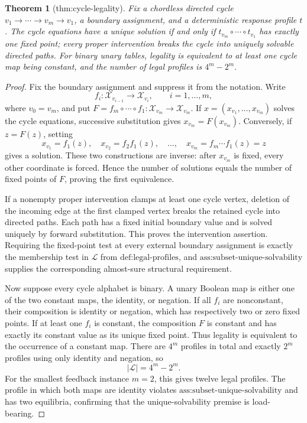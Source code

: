 \documentclass{article}
\newtheorem{theorem}{Theorem}
\begin{document}
\begin{theorem}[thm:cycle-legality]\label{thm:cycle-legality}
Fix a chordless directed cycle \(v_1\to\cdots\to v_m\to v_1\), a boundary assignment, and a deterministic response profile \(t\). The cycle equations have a unique solution if and only if \(t_{v_m}\circ\cdots\circ t_{v_1}\) has exactly one fixed point; every proper intervention breaks the cycle into uniquely solvable directed paths. For binary unary tables, legality is equivalent to at least one cycle map being constant, and the number of legal profiles is \(4^m-2^m\).
\end{theorem}
\begin{proof}
Fix the boundary assignment and suppress it from the notation.  Write
\[
 f_i:\mathcal X_{v_{i-1}}\longrightarrow\mathcal X_{v_i},\qquad i=1,\ldots,m,
\]
where \(v_0=v_m\), and put \(F=f_m\circ\cdots\circ f_1:\mathcal X_{v_m}\to\mathcal X_{v_m}\).  If \(x=(x_{v_1},\ldots,x_{v_m})\) solves the cycle equations, successive substitution gives \(x_{v_m}=F(x_{v_m})\).  Conversely, if \(z=F(z)\), setting
\[
 x_{v_1}=f_1(z),\quad x_{v_2}=f_2f_1(z),\quad\ldots,\quad x_{v_m}=f_m\cdots f_1(z)=z
\]
gives a solution.  These two constructions are inverse: after \(x_{v_m}\) is fixed, every other coordinate is forced.  Hence the number of solutions equals the number of fixed points of \(F\), proving the first equivalence.

If a nonempty proper intervention clamps at least one cycle vertex, deletion of the incoming edge at the first clamped vertex breaks the retained cycle into directed paths.  Each path has a fixed initial boundary value and is solved uniquely by forward substitution.  This proves the intervention assertion.  Requiring the fixed-point test at every external boundary assignment is exactly the membership test in \(\mathcal L\) from \(\text{def:legal-profiles}\), and \(\text{ass:subset-unique-solvability}\) supplies the corresponding almost-sure structural requirement.

Now suppose every cycle alphabet is binary.  A unary Boolean map is either one of the two constant maps, the identity, or negation.  If all \(f_i\) are nonconstant, their composition is identity or negation, which has respectively two or zero fixed points.  If at least one \(f_i\) is constant, the composition \(F\) is constant and has exactly its constant value as its unique fixed point.  Thus legality is equivalent to the occurrence of a constant map.  There are \(4^m\) profiles in total and exactly \(2^m\) profiles using only identity and negation, so
\[
 |\mathcal L|=4^m-2^m.
\]
For the smallest feedback instance \(m=2\), this gives twelve legal profiles.  The profile in which both maps are identity violates \(\text{ass:subset-unique-solvability}\) and has two equilibria, confirming that the unique-solvability premise is load-bearing.
\end{proof}
\end{document}
